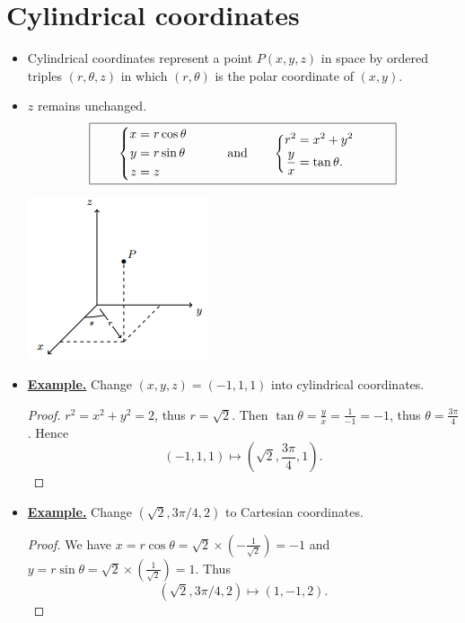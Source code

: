 
\section{Cylindrical coordinates}
\begin{itemize}
    \item Cylindrical coordinates represent a point $P(x,y,z)$ in space by ordered triples $(r,\theta, z)$ in which $(r,\theta)$ is the polar coordinate of $(x,y)$.
    \item $z$ remains unchanged.
    \begin{equation*}
    \fbox{$
    \qquad
        \begin{cases}
            \begin{aligned}
                x &= r\cos \theta \\
                y &= r\sin \theta \\
                z &= z 
            \end{aligned}
        \end{cases} \qquad 
        \text{and}\qquad 
        \begin{cases}
            \begin{aligned}
                r^2 &= x^2 + y^2  \\
                \frac{y}{x} &= \tan \theta .
            \end{aligned}
        \end{cases}
        \qquad
        $}
    \end{equation*}
    \begin{center}
        \includegraphics[scale=0.7]{content/09-cylindrical.png}
    \end{center}
    \item \underline{\textbf{Example.}} Change $(x,y,z) = (-1,1,1)$ into cylindrical coordinates.
    \begin{proof} $r^2 = x^2+y^2 = 2$, thus $r=\sqrt{2}$. Then $\tan\theta = \frac{y}{x} = \frac{1}{-1} = -1$, thus $\theta = \frac{3\pi}{4}$. Hence 
    $$(-1,1,1)\mapsto \left(\sqrt{2}, \frac{3\pi}{4}, 1\right).$$
    \end{proof}
    \item \underline{\textbf{Example.}} Change $(\sqrt{2}, 3\pi/4, 2)$ to Cartesian coordinates.
    \begin{proof} We have $x = r\cos \theta = \sqrt{2}\times \left(-\frac{1}{\sqrt{2}}\right) = -1$ and $y = r\sin \theta = \sqrt{2}\times \left(\frac{1}{\sqrt{2}}\right) = 1$. Thus 
    $$(\sqrt{2}, 3\pi/4, 2)\mapsto (1,-1, 2).$$
    \end{proof}
\end{itemize}

